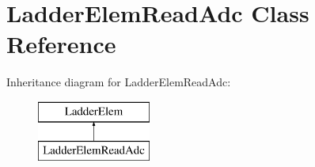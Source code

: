 \hypertarget{class_ladder_elem_read_adc}{\section{Ladder\-Elem\-Read\-Adc Class Reference}
\label{class_ladder_elem_read_adc}
}
Inheritance diagram for Ladder\-Elem\-Read\-Adc\-:\begin{figure}[H]
\begin{center}
\leavevmode
\includegraphics[height=2.000000cm]{class_ladder_elem_read_adc}
\end{center}
\end{figure}
